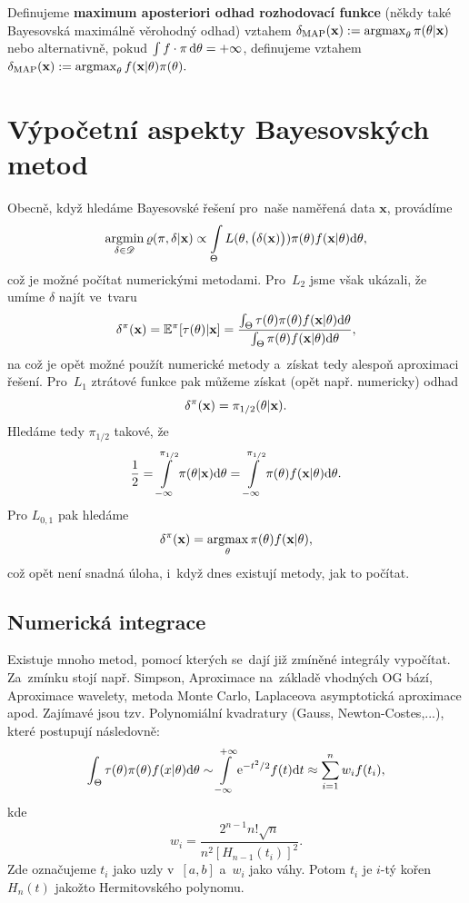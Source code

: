 \begin{define}
	Definujeme \textbf{maximum aposteriori odhad rozhodovací funkce} (někdy také Bayesovská maximálně věrohodný odhad) vztahem $\delta_\mathrm{MAP}(\textbf{x}):=\mathop{\mathrm{argmax}}_\theta \pi(\theta|\textbf{x})$ nebo alternativně, pokud $\int f\cdot\pi\,\mathrm{d}\theta=+\infty$, definujeme vztahem  $\delta_\mathrm{MAP}(\textbf{x}):=\mathop{\mathrm{argmax}}_\theta f(\textbf{x}|\theta)\pi(\theta).$
\end{define}

\chapter{Výpočetní aspekty Bayesovských metod}
Obecně, když hledáme Bayesovské řešení pro~naše naměřená data $\textbf{x}$, provádíme 
$$ \mathop{\mathrm{argmin}}\limits_{\delta\in\mathscr{D}} \varrho(\pi,\delta|\textbf{x})\propto \int\limits_\Theta L(\theta,\big(\delta(\textbf{x})\big))\pi(\theta)f(\textbf{x}|\theta)\mathrm{d}\theta,$$
což je možné počítat numerickými metodami. Pro~$L_2$ jsme však ukázali, že umíme $\delta$ najít ve~tvaru
$$ \delta^\pi(\textbf{x})=\mathbb{E}^\pi[\tau(\theta)|\textbf{x}]=\frac{\int_\Theta \tau(\theta)\pi(\theta)f(\textbf{x}|\theta)\mathrm{d}\theta}{\int_\Theta \pi(\theta)f(\textbf{x}|\theta)\mathrm{d}\theta},$$
na což je opět možné použít numerické metody a~získat tedy alespoň aproximaci řešení. Pro~$L_1$ ztrátové funkce pak můžeme získat (opět např. numericky) odhad
$$ \delta^\pi(\textbf{x})=\pi_{1/2}(\theta|\textbf{x}).$$
Hledáme tedy $\pi_{1/2}$ takové, že 
$$ \frac{1}{2}=\int\limits_{-\infty}^{\pi_{1/2}}\pi(\theta|\textbf{x})\mathrm{d}\theta=\int\limits_{-\infty}^{\pi_{1/2}}\pi(\theta)f(\textbf{x}|\theta)\mathrm{d}\theta.$$
Pro $L_{0,1}$ pak hledáme
$$ \delta^\pi(\textbf{x})=\mathop{\mathrm{argmax}}\limits_{\theta}\pi(\theta)f(\textbf{x}|\theta), $$
což opět není snadná úloha, i~když dnes existují metody, jak to počítat.

\section{Numerická integrace}
Existuje mnoho metod, pomocí kterých se~dají již zmíněné integrály vypočítat. Za~zmínku stojí např. Simpson, Aproximace na~základě vhodných OG bází, Aproximace wavelety, metoda Monte Carlo, Laplaceova asymptotická aproximace apod. Zajímavé jsou tzv. Polynomiální kvadratury (Gauss, Newton-Costes,...), které postupují následovně:
$$ \int_\Theta \tau(\theta)\pi(\theta)f(x|\theta)\mathrm{d}\theta\sim\int\limits_{-\infty}^{+\infty}\mathrm{e}^{-t^2/2}f(t)\mathrm{d} t\approx \sum\limits_{i=1}^{n} w_i f(t_i), $$
kde $$ w_i=\frac{2^{n-1}n!\sqrt{n}}{n^2[H_{n-1}(t_i)]^2}.$$
Zde označujeme $t_i$ jako uzly v~$[a,b]$ a~$w_i$ jako váhy. Potom $t_i$ je $i$-tý kořen $H_n(t)$ jakožto Hermitovského polynomu.


